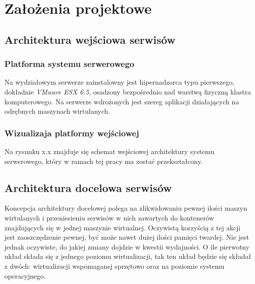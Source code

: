 \documentclass[polish, a4paper, 12pt, oneside]{book}
\begin{document}

\chapter{Założenia projektowe}
\section{Architektura wejściowa serwisów}
\subsection{Platforma systemu serwerowego}
Na wydziałowym serwerze zainstalowny jest hipernadzorca typu pierwszego, dokładnie \textit{VMware ESX 6.5}\cite{vmwareesx}, osadzony bezpośrednio nad warstwą fizyczną klastra komputerowego. Na serwerze wdrożonych jest szereg aplikacji działających na odrębnych maszynach wirtulanych. 

\subsection {Wizualizaja platformy wejściowej} Na rysunku x.x znajduje się schemat wejściowej architektury systemu serwerowego, który w ramach tej pracy ma zostać przekształcony.

\section{Architektura docelowa serwisów}
Koncepcja architektury docelowej polega na zlikwidowaniu pewnej ilości maszyn wirtulanych i przeniesieniu serwisów w nich zawartych do kontenerów znajdujących się w jednej maszynie wirtualnej. Oczywistą korzyścią z tej akcji jest zaoszczędzenie pewnej, być może nawet dużej ilości  pamięci twardej. Nie jest jednak oczywiste, do jakiej zmiany dojdzie w kwestii wydajności. O ile pierwotny układ składa się z jednego poziomu wirtualizacji, tak ten układ będzie się składał z dwóch: wirtualizacji wspomaganej sprzętowo oraz na poziomie systemu operacyjnego.
\end{document}
